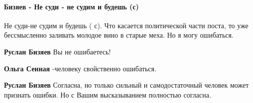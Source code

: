  
 
 
 
 
\paragraph{Бизяев - Не суди - не судим и будешь (с)}

\begin{itemize}
 

Не суди-не судим и будешь ( с). Что касается политической части поста, то уже
бессмысленно заливать молодое вино в старые меха. Но я могу ошибаться.

\begin{itemize}
 
\textbf{Руслан Бизяев} Вы не ошибаетесь!

 
\textbf{Ольга Сенная} -человеку свойственно ошибаться.

 
\textbf{Руслан Бизяев} Согласна, но только сильный и самодостаточный человек может признать ошибки. Но с Вашим высказыванием полностью согласна.
\end{itemize}


\end{itemize}
